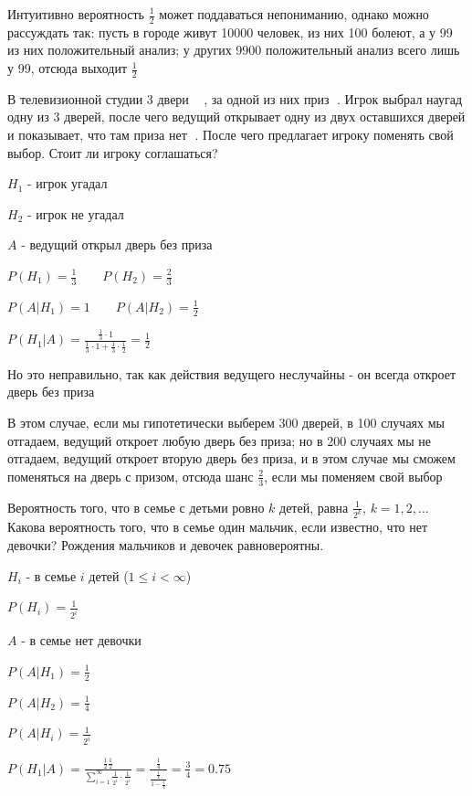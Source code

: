 \documentclass[12pt]{article}
\begin{document}
    Интуитивно вероятность $\frac{1}{2}$ может поддаваться непониманию, однако можно рассуждать так:
    пусть в городе живут 10000 человек, из них 100 болеют, а у 99 из них положительный анализ; у других 9900 положительный анализ всего лишь у 99, отсюда выходит $\frac{1}{2}$

     В телевизионной студии 3 двери {\Large 🚪🚪🚪}, за одной из них приз {\Large 🚗}.
    Игрок выбрал наугад одну из 3 дверей, после чего ведущий открывает одну из двух оставшихся дверей и показывает, что там приза нет {\Large 🛴}. После чего
    предлагает игроку поменять свой выбор. Стоит ли игроку соглашаться?

    $H_1$ - игрок угадал

    $H_2$ - игрок не угадал

    $A$ - ведущий открыл дверь без приза

    $P(H_1) = \frac{1}{3} \quad\quad P(H_2) = \frac{2}{3}$

    $P(A|H_1) = 1 \quad\quad P(A|H_2) = \frac{1}{2}$

    $P(H_1|A) = \frac{\frac{1}{3} \cdot 1}{\frac{1}{3} \cdot 1 + \frac{1}{3} \cdot \frac{1}{2}} = \frac{1}{2}$

    Но это неправильно, так как действия ведущего неслучайны - он всегда откроет дверь без приза

    В этом случае, если мы гипотетически выберем 300 дверей, в 100 случаях мы отгадаем, ведущий откроет любую дверь без приза;
    но в 200 случаях мы не отгадаем, ведущий откроет вторую дверь без приза, и в этом случае мы сможем поменяться на дверь с призом,
    отсюда шанс $\frac{2}{3}$, если мы поменяем свой выбор \hfill


     Вероятность того, что в семье с детьми ровно $k$ детей, равна $\frac{1}{2^k}$, $k = 1, 2, \dots$
    Какова вероятность того, что в семье один мальчик, если известно, что нет
    девочки? Рождения мальчиков и девочек равновероятны.


    $H_i$ - в семье $i$ детей ($1 \leq i < \infty$)

    $P(H_i) = \frac{1}{2^i}$

    $A$ - в семье нет девочки

    $P(A|H_1) = \frac{1}{2}$

    $P(A|H_2) = \frac{1}{4}$

    $P(A|H_i) = \frac{1}{2^i}$

    $P(H_1 | A) = \frac{\frac{1}{2} \frac{1}{2}}{\sum_{i = 1}^\infty \frac{1}{2^i} \cdot \frac{1}{2^i}} = \frac{\frac{1}{4}}{\frac{\frac{1}{4}}{1 - \frac{1}{4}}} = \frac{3}{4} = 0.75$
\end{document}
